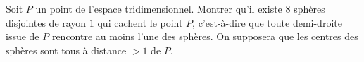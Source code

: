 Soit $P$ un point de l'espace tridimensionnel. Montrer qu'il existe $8$ sphères disjointes de rayon $1$ qui cachent le point $P$, c'est-à-dire que toute demi-droite issue de $P$ rencontre au moins l'une des sphères. On supposera que les centres des sphères sont tous à distance $> 1$ de $P$.